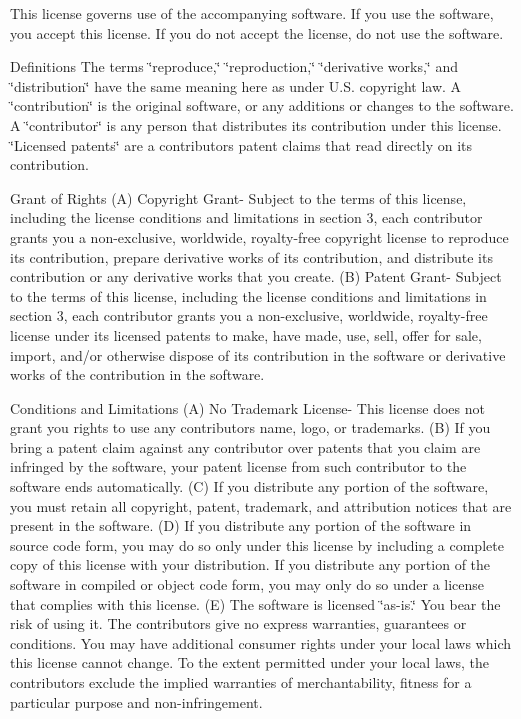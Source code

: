 This license governs use of the accompanying software. If you use the software, you accept this license. If you do not accept the license, do not use the software.


\begin{DoxyEnumerate}
\item Definitions The terms \char`\"{}reproduce,\char`\"{} \char`\"{}reproduction,\char`\"{} \char`\"{}derivative works,\char`\"{} and \char`\"{}distribution\char`\"{} have the same meaning here as under U.\+S. copyright law. A \char`\"{}contribution\char`\"{} is the original software, or any additions or changes to the software. A \char`\"{}contributor\char`\"{} is any person that distributes its contribution under this license. \char`\"{}\+Licensed patents\char`\"{} are a contributor\textquotesingle{}s patent claims that read directly on its contribution.
\item Grant of Rights (A) Copyright Grant-\/ Subject to the terms of this license, including the license conditions and limitations in section 3, each contributor grants you a non-\/exclusive, worldwide, royalty-\/free copyright license to reproduce its contribution, prepare derivative works of its contribution, and distribute its contribution or any derivative works that you create. (B) Patent Grant-\/ Subject to the terms of this license, including the license conditions and limitations in section 3, each contributor grants you a non-\/exclusive, worldwide, royalty-\/free license under its licensed patents to make, have made, use, sell, offer for sale, import, and/or otherwise dispose of its contribution in the software or derivative works of the contribution in the software.
\item Conditions and Limitations (A) No Trademark License-\/ This license does not grant you rights to use any contributors\textquotesingle{} name, logo, or trademarks. (B) If you bring a patent claim against any contributor over patents that you claim are infringed by the software, your patent license from such contributor to the software ends automatically. (C) If you distribute any portion of the software, you must retain all copyright, patent, trademark, and attribution notices that are present in the software. (D) If you distribute any portion of the software in source code form, you may do so only under this license by including a complete copy of this license with your distribution. If you distribute any portion of the software in compiled or object code form, you may only do so under a license that complies with this license. (E) The software is licensed \char`\"{}as-\/is.\char`\"{} You bear the risk of using it. The contributors give no express warranties, guarantees or conditions. You may have additional consumer rights under your local laws which this license cannot change. To the extent permitted under your local laws, the contributors exclude the implied warranties of merchantability, fitness for a particular purpose and non-\/infringement. 
\end{DoxyEnumerate}